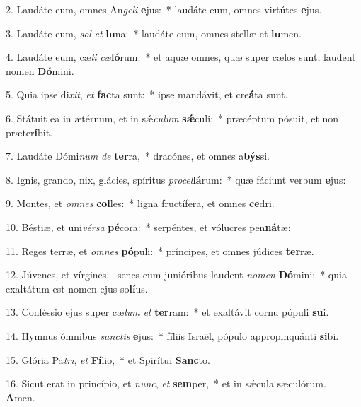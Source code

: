 2. Laudáte eum, omnes An\textit{ge}\textit{li} \textbf{e}jus:~*  laudáte eum, omnes virtútes \textbf{e}jus.\

3. Laudáte eum, \textit{sol} \textit{et} \textbf{lu}na:~*  laudáte eum, omnes stellæ et \textbf{lu}men.\

4. Laudáte eum, cæ\textit{li} \textit{cæ}\textbf{ló}rum:~*  et aquæ omnes, quæ super cælos sunt, laudent nomen \textbf{Dó}mini.\

5. Quia ipse di\textit{xit}, \textit{et} \textbf{fac}ta sunt:~*  ipse mandávit, et cre\textbf{á}ta sunt.\

6. Státuit ea in ætérnum, et in sǽ\textit{cu}\textit{lum} \textbf{sǽ}culi:~*  præcéptum pósuit, et non præter\textbf{í}bit.\

7. Laudáte Dómi\textit{num} \textit{de} \textbf{ter}ra,~*  dracónes, et omnes a\textbf{býs}si.\

8. Ignis, grando, nix, glácies, spíritus \textit{pro}\textit{cel}\textbf{lá}rum:~*  quæ fáciunt verbum \textbf{e}jus:\

9. Montes, et \textit{om}\textit{nes} \textbf{col}les:~*  ligna fructífera, et omnes \textbf{ce}dri.\

10. Béstiæ, et uni\textit{vér}\textit{sa} \textbf{pé}cora:~*  serpéntes, et vólucres pen\textbf{ná}tæ:\

11. Reges terræ, et \textit{om}\textit{nes} \textbf{pó}puli:~*  príncipes, et omnes júdices \textbf{ter}ræ.\

12. Júvenes, et vírgines, \dag\  senes cum junióribus laudent \textit{no}\textit{men} \textbf{Dó}mini:~*  quia exaltátum est nomen ejus so\textbf{lí}us.\

13. Conféssio ejus super cæ\textit{lum} \textit{et} \textbf{ter}ram:~*  et exaltávit cornu pópuli \textbf{su}i.\

14. Hymnus ómnibus \textit{sanc}\textit{tis} \textbf{e}jus:~*  fíliis Israël, pópulo appropinquánti \textbf{si}bi.\

15. Glória Pa\textit{tri}, \textit{et} \textbf{Fí}lio,~*  et Spirítui \textbf{Sanc}to.\

16. Sicut erat in princípio, et \textit{nunc}, \textit{et} \textbf{sem}per,~*  et in sǽcula sæculórum. \textbf{A}men.\

